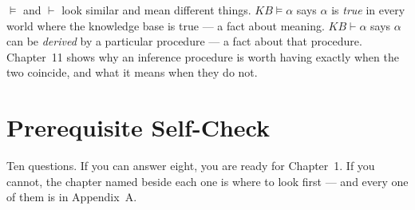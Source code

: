 \begin{alertbox}
$\models$ and $\vdash$ look similar and mean different things.
$\mathit{KB} \models \alpha$ says $\alpha$ is \emph{true} in every world where the
knowledge base is true --- a fact about meaning. $\mathit{KB} \vdash \alpha$ says
$\alpha$ can be \emph{derived} by a particular procedure --- a fact about that
procedure. Chapter~11 shows why an inference procedure is worth having exactly
when the two coincide, and what it means when they do not.
\end{alertbox}

\newpage

\chapter*{Prerequisite Self-Check}

Ten questions. If you can answer eight, you are ready for Chapter~1. If you cannot,
the chapter named beside each one is where to look first --- and every one of them
is in Appendix~A.


